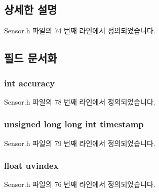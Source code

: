 \subsection{상세한 설명}


Sensor.\-h 파일의 74 번째 라인에서 정의되었습니다.



\subsection{필드 문서화}
\hypertarget{struct___ultra_violet__data_a5565cf9073275f9713f9016e7c10d25f}{
\subsubsection[{accuracy}]{\setlength{\rightskip}{0pt plus 5cm}int accuracy}}\label{struct___ultra_violet__data_a5565cf9073275f9713f9016e7c10d25f}


Sensor.\-h 파일의 78 번째 라인에서 정의되었습니다.

\hypertarget{struct___ultra_violet__data_a8de02c4128636a7bf630ff5428f60c8d}{
\subsubsection[{timestamp}]{\setlength{\rightskip}{0pt plus 5cm}unsigned long long int timestamp}}\label{struct___ultra_violet__data_a8de02c4128636a7bf630ff5428f60c8d}


Sensor.\-h 파일의 79 번째 라인에서 정의되었습니다.

\hypertarget{struct___ultra_violet__data_a46f441c4177376452cb467caa0b7fa46}{
\subsubsection[{uvindex}]{\setlength{\rightskip}{0pt plus 5cm}float uvindex}}\label{struct___ultra_violet__data_a46f441c4177376452cb467caa0b7fa46}


Sensor.\-h 파일의 76 번째 라인에서 정의되었습니다.

